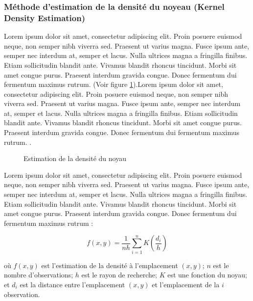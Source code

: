 \medskip

\subsubsection{Méthode d'estimation de la densité du noyeau (Kernel Density Estimation)}
Lorem ipsum dolor sit amet, consectetur adipiscing elit. Proin posuere euismod neque, non semper nibh viverra sed. Praesent ut varius magna. Fusce ipsum ante, semper nec interdum at, semper et lacus. Nulla ultrices magna a fringilla finibus. Etiam sollicitudin blandit ante. Vivamus blandit rhoncus tincidunt. Morbi sit amet congue purus. Praesent interdum gravida congue. Donec fermentum dui fermentum maximus rutrum. \parencite{hart_kernel_2014} (Voir figure \ref{fig:kde}).Lorem ipsum dolor sit amet, consectetur adipiscing elit. Proin posuere euismod neque, non semper nibh viverra sed. Praesent ut varius magna. Fusce ipsum ante, semper nec interdum at, semper et lacus. Nulla ultrices magna a fringilla finibus. Etiam sollicitudin blandit ante. Vivamus blandit rhoncus tincidunt. Morbi sit amet congue purus. Praesent interdum gravida congue. Donec fermentum dui fermentum maximus rutrum. \parencite{gatrell_spatial_1996}. 

\begin{figure}[hbt!]
  \centering
  \caption{Estimation de la densité du noyau \parencite{hart_kernel_2014}}
  \label{fig:kde}
\end{figure}
\FloatBarrier

\medskip

\medskip

Lorem ipsum dolor sit amet, consectetur adipiscing elit. Proin posuere euismod neque, non semper nibh viverra sed. Praesent ut varius magna. Fusce ipsum ante, semper nec interdum at, semper et lacus. Nulla ultrices magna a fringilla finibus. Etiam sollicitudin blandit ante. Vivamus blandit rhoncus tincidunt. Morbi sit amet congue purus. Praesent interdum gravida congue. Donec fermentum dui fermentum maximus rutrum \parencite{fotheringham_quantitative_2007} :

\medskip

\begin{equation}
   \displaystyle f(x,y) = \frac{1}{nh} \sum_{i=1}^{n} K (\frac{d_i}{h})
   \label{kernel-density-estimation}
\end{equation}

\medskip

où $f(x, y)$ est l'estimation de la densité à l'emplacement $(x, y)$; $n$ est le nombre d'observations; $h$ est le rayon de recherche; $K$ est une fonction du noyau; et $d_i$ est la distance entre l'emplacement $(x, y)$ et l'emplacement de la $i$ observation.





